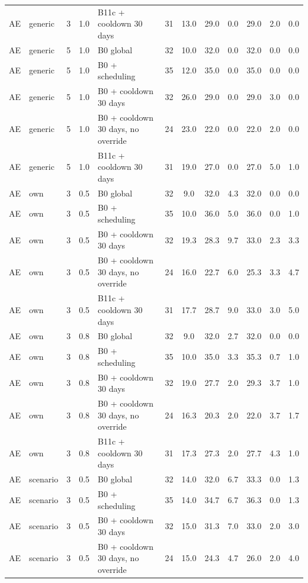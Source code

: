 \documentclass[10pt,onecolumn,letterpaper]{article}
\begin{document}
\begin{longtable}{lllllccccccc}
AE & generic & 3 & 1.0 & B11c + cooldown 30 days & 31 & 13.0 & 29.0 & 0.0 & 29.0 & 2.0 & 0.0 \\
AE & generic & 5 & 1.0 & B0 global & 32 & 10.0 & 32.0 & 0.0 & 32.0 & 0.0 & 0.0 \\
AE & generic & 5 & 1.0 & B0 + scheduling & 35 & 12.0 & 35.0 & 0.0 & 35.0 & 0.0 & 0.0 \\
AE & generic & 5 & 1.0 & B0 + cooldown 30 days & 32 & 26.0 & 29.0 & 0.0 & 29.0 & 3.0 & 0.0 \\
AE & generic & 5 & 1.0 & B0 + cooldown 30 days, no override & 24 & 23.0 & 22.0 & 0.0 & 22.0 & 2.0 & 0.0 \\
AE & generic & 5 & 1.0 & B11c + cooldown 30 days & 31 & 19.0 & 27.0 & 0.0 & 27.0 & 5.0 & 1.0 \\
AE & own & 3 & 0.5 & B0 global & 32 & 9.0 & 32.0 & 4.3 & 32.0 & 0.0 & 0.0 \\
AE & own & 3 & 0.5 & B0 + scheduling & 35 & 10.0 & 36.0 & 5.0 & 36.0 & 0.0 & 1.0 \\
AE & own & 3 & 0.5 & B0 + cooldown 30 days & 32 & 19.3 & 28.3 & 9.7 & 33.0 & 2.3 & 3.3 \\
AE & own & 3 & 0.5 & B0 + cooldown 30 days, no override & 24 & 16.0 & 22.7 & 6.0 & 25.3 & 3.3 & 4.7 \\
AE & own & 3 & 0.5 & B11c + cooldown 30 days & 31 & 17.7 & 28.7 & 9.0 & 33.0 & 3.0 & 5.0 \\
AE & own & 3 & 0.8 & B0 global & 32 & 9.0 & 32.0 & 2.7 & 32.0 & 0.0 & 0.0 \\
AE & own & 3 & 0.8 & B0 + scheduling & 35 & 10.0 & 35.0 & 3.3 & 35.3 & 0.7 & 1.0 \\
AE & own & 3 & 0.8 & B0 + cooldown 30 days & 32 & 19.0 & 27.7 & 2.0 & 29.3 & 3.7 & 1.0 \\
AE & own & 3 & 0.8 & B0 + cooldown 30 days, no override & 24 & 16.3 & 20.3 & 2.0 & 22.0 & 3.7 & 1.7 \\
AE & own & 3 & 0.8 & B11c + cooldown 30 days & 31 & 17.3 & 27.3 & 2.0 & 27.7 & 4.3 & 1.0 \\
AE & scenario & 3 & 0.5 & B0 global & 32 & 14.0 & 32.0 & 6.7 & 33.3 & 0.0 & 1.3 \\
AE & scenario & 3 & 0.5 & B0 + scheduling & 35 & 14.0 & 34.7 & 6.7 & 36.3 & 0.0 & 1.3 \\
AE & scenario & 3 & 0.5 & B0 + cooldown 30 days & 32 & 15.0 & 31.3 & 7.0 & 33.0 & 2.0 & 3.0 \\
AE & scenario & 3 & 0.5 & B0 + cooldown 30 days, no override & 24 & 15.0 & 24.3 & 4.7 & 26.0 & 2.0 & 4.0 \\

\end{longtable}
\end{document}
